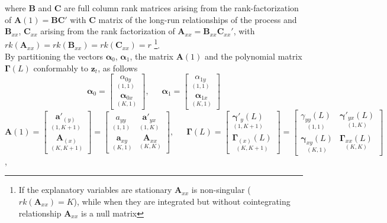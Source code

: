 where $\mathbf{B}$ and $\mathbf{C}$ are full column rank matrices arising from the rank-factorization of $\mathbf{A}(1)=\mathbf{B}\mathbf{C}'$ with $\mathbf{C}$ matrix of the long-run relationships of the process    
and $\mathbf{B}_{xx}$, $\mathbf{C}_{xx}$ arising from the rank factorization of $\mathbf{A}_{xx}=\mathbf{B}_{xx}\mathbf{C}_{xx}'$, with $rk(\mathbf{A}_{xx})=rk(\mathbf{B}_{xx})=rk(\mathbf{C}_{xx})=r$ \footnote{ If the explanatory variables are stationary $\mathbf{A}_{xx}$ is non-singular ($rk(\mathbf{A}_{xx})=K$), while when they are integrated but without cointegrating relationship $\mathbf{A}_{xx}$ is a null matrix }. \\
By partitioning the vectors $\boldsymbol{\alpha}_{0}$, $\boldsymbol{\alpha}_{1}$, the matrix $\mathbf{A}(1)$ and the polynomial matrix $\boldsymbol{\Gamma}(L)$ conformably to $\mathbf{z}_{t}$, as follows
\begin{equation}\label{eq:alphapart}
\boldsymbol{\alpha}_0=\begin{bmatrix}
\underset{(1,1)}{\alpha_{0y}}  \\ \underset{(K,1)}{\boldsymbol{\alpha}_{0x}} 
\end{bmatrix}, \enspace \enspace \enspace \boldsymbol{\alpha}_1=\begin{bmatrix}
\underset{(1,1)}{\alpha_{1y}}  \\ \underset{(K,1)}{\boldsymbol{\alpha}_{1x} }
\end{bmatrix}
\end{equation}
\begin{equation}\label{eq:coeffpart}
\mathbf{A}(1)=\begin{bmatrix}
\underset{(1,K+1)}{\mathbf{a}'_{(y)}}  \\ \underset{(K,K+1)}{\mathbf{A}_{(x)}} 
\end{bmatrix}
=\begin{bmatrix}
\underset{(1,1)}{a_{yy}} & \underset{(1,K)}{\mathbf{a}'_{yx}}  \\ \underset{(K,1)}{\mathbf{a}_{xy}} & \underset{(K,K)}{\mathbf{A}_{xx} }
\end{bmatrix}, 
\enspace \enspace \enspace
\boldsymbol{\Gamma}(L)=\begin{bmatrix}
\underset{(1,K+1)}{\boldsymbol{\gamma}'_{y}(L)}  \\ \underset{(K,K+1)}{\boldsymbol{\Gamma}_{(x)}(L)} 
\end{bmatrix}
=\begin{bmatrix}
\underset{(1,1)}{\gamma_{yy}(L)} & \underset{(1,K)}{\boldsymbol{\gamma}'_{yx}(L)}  \\ \underset{(K,1)}{\boldsymbol{\gamma}_{xy}(L)} & \underset{(K,K)}{\boldsymbol{\Gamma}_{xx}(L) }
\end{bmatrix}
\end{equation},
